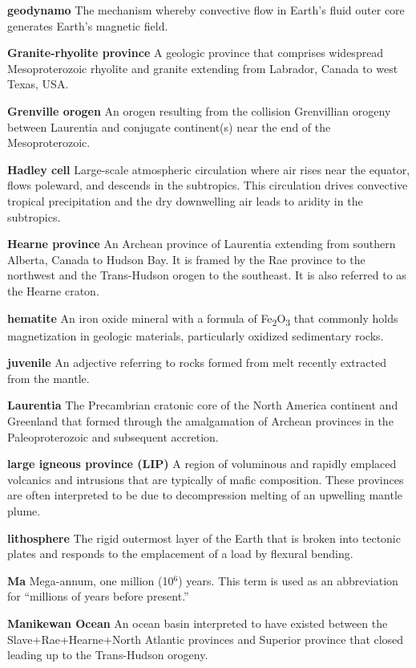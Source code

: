 \documentclass[twocolumn, switch]{article} %
\begin{document}
\noindent\textbf{geodynamo } The mechanism whereby convective flow in Earth's fluid outer core generates Earth's magnetic field.

\noindent\textbf{Granite-rhyolite province } A geologic province that comprises widespread Mesoproterozoic rhyolite and granite extending from Labrador, Canada to west Texas, USA.

\noindent\textbf{Grenville orogen } An orogen resulting from the collision Grenvillian orogeny between Laurentia and conjugate continent(s) near the end of the Mesoproterozoic.

\noindent\textbf{Hadley cell } Large-scale atmospheric circulation where air rises near the equator, flows poleward, and descends in the subtropics. This circulation drives convective tropical precipitation and the dry downwelling air leads to aridity in the subtropics.

\noindent\textbf{Hearne province } An Archean province of Laurentia extending from southern Alberta, Canada to Hudson Bay. It is framed by the Rae province to the northwest and the Trans-Hudson orogen to the southeast. It is also referred to as the Hearne craton.

\noindent\textbf{hematite } An iron oxide mineral with a formula of Fe\textsubscript{2}O\textsubscript{3} that commonly holds magnetization in geologic materials, particularly oxidized sedimentary rocks.

\noindent\textbf{juvenile } An adjective referring to rocks formed from melt recently extracted from the mantle.

\noindent\textbf{Laurentia } The Precambrian cratonic core of the North America continent and Greenland that formed through the amalgamation of Archean provinces in the Paleoproterozoic and subsequent accretion.

\noindent\textbf{large igneous province (LIP) } A region of voluminous and rapidly emplaced volcanics and intrusions that are typically of mafic composition. These provinces are often interpreted to be due to decompression melting of an upwelling mantle plume.

\noindent\textbf{lithosphere } The rigid outermost layer of the Earth that is broken into tectonic plates and responds to the emplacement of a load by flexural bending.

\noindent\textbf{Ma } Mega-annum, one million (10$^6$) years. This term is used as an abbreviation for ``millions of years before present.''

\noindent\textbf{Manikewan Ocean } An ocean basin interpreted to have existed between the  Slave+Rae+Hearne+North Atlantic provinces and Superior province that closed leading up to the Trans-Hudson orogeny.
\end{document}
